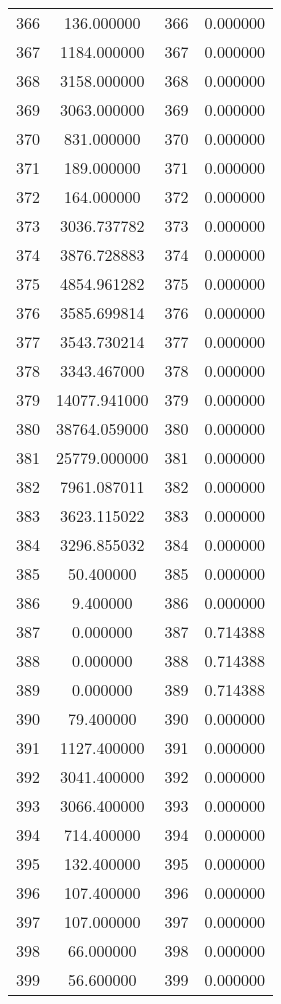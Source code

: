 \documentclass[12pt]{article}
\begin{document}
\begin{longtable}{@{}cccc@{}}
366 & 136.000000 & 366 & 0.000000 \\
367 & 1184.000000 & 367 & 0.000000 \\
368 & 3158.000000 & 368 & 0.000000 \\
369 & 3063.000000 & 369 & 0.000000 \\
370 & 831.000000 & 370 & 0.000000 \\
371 & 189.000000 & 371 & 0.000000 \\
372 & 164.000000 & 372 & 0.000000 \\
373 & 3036.737782 & 373 & 0.000000 \\
374 & 3876.728883 & 374 & 0.000000 \\
375 & 4854.961282 & 375 & 0.000000 \\
376 & 3585.699814 & 376 & 0.000000 \\
377 & 3543.730214 & 377 & 0.000000 \\
378 & 3343.467000 & 378 & 0.000000 \\
379 & 14077.941000 & 379 & 0.000000 \\
380 & 38764.059000 & 380 & 0.000000 \\
381 & 25779.000000 & 381 & 0.000000 \\
382 & 7961.087011 & 382 & 0.000000 \\
383 & 3623.115022 & 383 & 0.000000 \\
384 & 3296.855032 & 384 & 0.000000 \\
385 & 50.400000 & 385 & 0.000000 \\
386 & 9.400000 & 386 & 0.000000 \\
387 & 0.000000 & 387 & 0.714388 \\
388 & 0.000000 & 388 & 0.714388 \\
389 & 0.000000 & 389 & 0.714388 \\
390 & 79.400000 & 390 & 0.000000 \\
391 & 1127.400000 & 391 & 0.000000 \\
392 & 3041.400000 & 392 & 0.000000 \\
393 & 3066.400000 & 393 & 0.000000 \\
394 & 714.400000 & 394 & 0.000000 \\
395 & 132.400000 & 395 & 0.000000 \\
396 & 107.400000 & 396 & 0.000000 \\
397 & 107.000000 & 397 & 0.000000 \\
398 & 66.000000 & 398 & 0.000000 \\
399 & 56.600000 & 399 & 0.000000 \\

\end{longtable}
\end{document}
